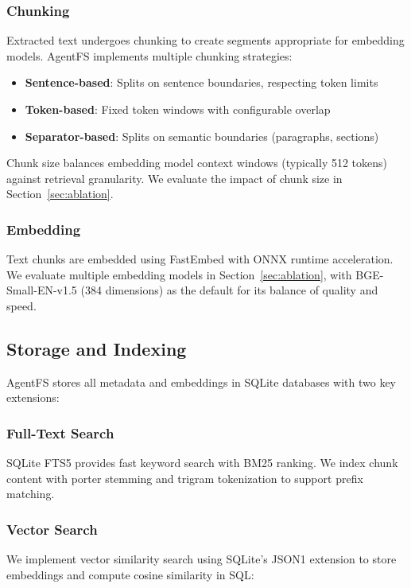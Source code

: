 \documentclass[conference]{IEEEtran}
\begin{document}
\subsubsection{Chunking}
Extracted text undergoes chunking to create segments appropriate for embedding models. AgentFS implements multiple chunking strategies:

\begin{itemize}
    \item \textbf{Sentence-based}: Splits on sentence boundaries, respecting token limits
    \item \textbf{Token-based}: Fixed token windows with configurable overlap
    \item \textbf{Separator-based}: Splits on semantic boundaries (paragraphs, sections)
\end{itemize}

Chunk size balances embedding model context windows (typically 512 tokens) against retrieval granularity. We evaluate the impact of chunk size in Section~\ref{sec:ablation}.

\subsubsection{Embedding}
Text chunks are embedded using FastEmbed with ONNX runtime acceleration. We evaluate multiple embedding models in Section~\ref{sec:ablation}, with BGE-Small-EN-v1.5 (384 dimensions) as the default for its balance of quality and speed.

\subsection{Storage and Indexing}

AgentFS stores all metadata and embeddings in SQLite databases with two key extensions:

\subsubsection{Full-Text Search}
SQLite FTS5 provides fast keyword search with BM25 ranking. We index chunk content with porter stemming and trigram tokenization to support prefix matching.

\subsubsection{Vector Search}
We implement vector similarity search using SQLite's JSON1 extension to store embeddings and compute cosine similarity in SQL:
\end{document}

